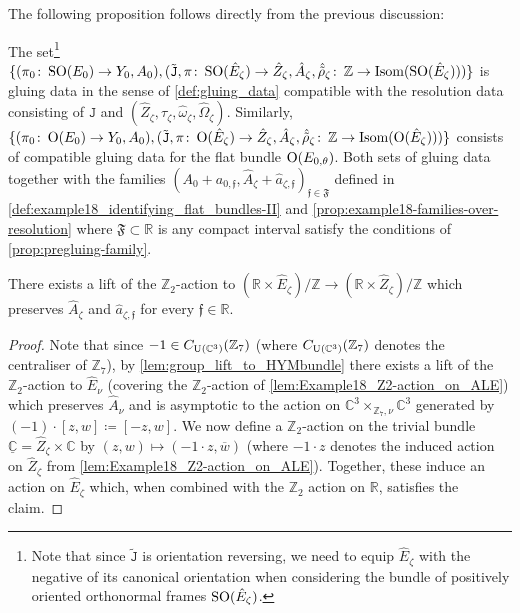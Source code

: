 \documentclass[11pt,a4paper]{scrartcl}
\newcommand{\col}{\colon \thinspace}
\newcommand{\SO}{\textup{SO}}
\renewcommand{\O}{\textup{O}}
\newcommand{\U}{\textup{U}}
\numberwithin{equation}{section}
\theoremstyle{plain}
\theoremstyle{definition}
\theoremstyle{remark}
\begin{document}
The following proposition follows directly from the previous discussion:
\begin{proposition}\label{prop:Example18_gluing_data}
The set\footnote{Note that since $\tilde{\mathtt{J}}$ is orientation reversing, we need to equip $\hat{E}_\zeta$ with the negative of its canonical orientation when considering the bundle of positively oriented orthonormal frames $\SO(\hat{E}_\zeta)$.} $\{(\pi_0\col \SO(E_{0})\to Y_0,A_0),(\tilde{\mathtt{J}},\pi\col \SO(\hat{E}_\zeta) \to \hat{Z}_\zeta,\hat{A}_\zeta,\hat{\tilde{\rho}}_\zeta\col \mathbb{Z}\to \textup{Isom}(\SO(\hat{E}_\zeta)))\}$ is gluing data in the sense of \autoref{def:gluing_data} compatible with the resolution data consisting of $\mathtt{J}$ and $(\hat{Z}_\zeta,\tau_\zeta,\hat{\omega}_\zeta,\hat{\Omega}_\zeta)$. Similarly, $\{(\pi_0 \col \O(E_0)\to Y_0, A_0),(\tilde{\mathtt{J}},\pi\col \O(\hat{E}_\zeta) \to \hat{Z}_\zeta,\hat{A}_\zeta,\hat{\tilde{\rho}}_\zeta\col \mathbb{Z}\to \textup{Isom}(\O(\hat{E}_\zeta)))\}$ consists of compatible gluing data for the flat bundle $\O(E_{0,\theta})$. Both sets of gluing data together with the families $(A_0+a_{0,\mathfrak{f}},\hat{A}_\zeta+\hat{a}_{\zeta,\mathfrak{f}})_{\mathfrak{f}\in \mathfrak{F}}$ defined in \autoref{def:example18_identifying_flat_bundles-II} and \autoref{prop:example18-families-over-resolution} where $\mathfrak{F}\subset \mathbb{R}$ is any compact interval satisfy the conditions of \autoref{prop:pregluing-family}.
\end{proposition}

\begin{proposition}\label{prop:example18 lift of Z2 action to resolution data}
There exists a lift of the $\mathbb{Z}_2$-action to $(\mathbb{R}\times \hat{E}_\zeta)/\mathbb{Z} \to (\mathbb{R}\times \hat{Z}_\zeta)/\mathbb{Z}$ which preserves $\hat{A}_\zeta$ and $\hat{a}_{\zeta,\mathfrak{f}}$ for every $\mathfrak{f}\in \mathbb{R}$.
\end{proposition}
\begin{proof}
Note that since $-1\in C_{\U(\mathbb{C}^3)}(\mathbb{Z}_7)$ (where $C_{\U(\mathbb{C}^3)}(\mathbb{Z}_7)$ denotes the centraliser of $\mathbb{Z}_7$), by \autoref{lem:group_lift_to_HYMbundle} there exists a lift of the $\mathbb{Z}_2$-action to $\hat{E}_\nu$ (covering the $\mathbb{Z}_2$-action of \autoref{lem:Example18_Z2-action_on_ALE}) which preserves $\hat{A}_\nu$ and is asymptotic to the action on $\mathbb{C}^3\times_{\mathbb{Z}_7,\nu} \mathbb{C}^3$ generated by $(-1) \cdot [z,w]\coloneqq[-z,w]$. We now define a $\mathbb{Z}_2$-action on the trivial bundle $\underline{\mathbb{C}} = \hat{Z}_\zeta \times \mathbb{C}$ by $(z,w) \mapsto (-1\cdot z, \overline{w})$ (where $-1 \cdot z$ denotes the induced action on $\hat{Z}_\zeta$ from \autoref{lem:Example18_Z2-action_on_ALE}). Together, these induce an action on $\hat{E}_\zeta$ which, when combined with the $\mathbb{Z}_2$ action on $\mathbb{R}$, satisfies the claim.
\end{proof}
\end{document}
